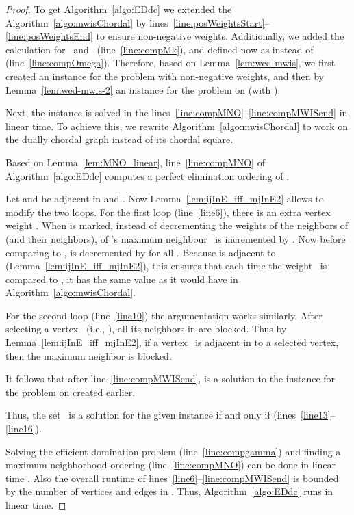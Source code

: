 \documentclass[]{elsarticle}
\def\mwis{{\sc{MWIS }}}
\def\minwed{{\sc{Min-WED }}}
\begin{document}
\begin{proof}

To get Algorithm~\ref{algo:EDdc} we extended the Algorithm~\ref{algo:mwisChordal} by lines~\ref{line:posWeightsStart}--\ref{line:posWeightsEnd} to ensure non-negative weights. 
Additionally, we added the calculation for~ and~ (line~\ref{line:compMk}), and defined  now as  instead of  (line~\ref{line:compOmega}). 
Therefore, based on Lemma~\ref{lem:wed-mwis}, we first created an instance  for the \minwed problem with non-negative weights, and then by Lemma~\ref{lem:wed-mwis-2} an instance  for the \mwis problem on  (with ).

Next, the \mwis instance is solved in the lines~\ref{line:compMNO}--\ref{line:compMWISend} in linear time.
To achieve this, we rewrite Algorithm~\ref{algo:mwisChordal} to work on the dually chordal graph instead of its chordal square.

Based on Lemma~\ref{lem:MNO_linear}, line~\ref{line:compMNO} of Algorithm~\ref{algo:EDdc} computes a perfect elimination ordering of .

Let  and  be adjacent in  and . Now Lemma~\ref{lem:ijInE_iff_mjInE2} allows to modify the two loops. 
For the first loop (line~\ref{line6}), there is an extra vertex weight . 
When  is marked, instead of decrementing the weights  of the neighbors of  (and their neighbors),  of 's maximum neighbour~ is incremented by .
Now before comparing  to ,  is decremented by  for all . 
Because  is adjacent to  (Lemma~\ref{lem:ijInE_iff_mjInE2}), this ensures that each time the weight~ is compared to , it has the same value as it would have in Algorithm~\ref{algo:mwisChordal}.

For the second loop (line~\ref{line10}) the argumentation works similarly. 
After selecting a vertex~ (i.e., ), all its neighbors in  are blocked. 
Thus by Lemma~\ref{lem:ijInE_iff_mjInE2}, if a vertex~ is adjacent in  to a selected vertex, then the maximum neighbor  is blocked.

It follows that after line~\ref{line:compMWISend},  is a solution to the instance  for the \mwis problem on  created earlier.
    
Thus, the set~ is a solution for the given \minwed instance if and only if  (lines~\ref{line13}--\ref{line16}).


\medskip
Solving the efficient domination problem (line~\ref{line:compgamma}) and finding a maximum neighborhood ordering (line~\ref{line:compMNO}) can be done in linear time \cite{BCD98,BLR}. 
Also the overall runtime of lines~\ref{line6}--\ref{line:compMWISend} is bounded by the number of vertices and edges in . 
Thus, Algorithm~\ref{algo:EDdc} runs in linear time.
\end{proof}
\end{document}
